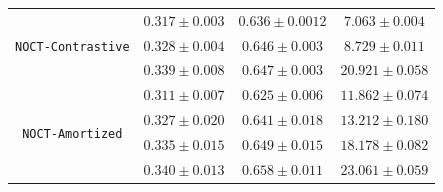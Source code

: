 \begin{table}[ht]
\begin{center}
\begin{sc}
{\begin{tabular}{c c c c}
        \multirow{3}{*}{\texttt{NOCT-Contrastive}} 
& $0.317\pm0.003$ & $0.636\pm0.0012$ & $7.063\pm0.004$ \\ 
& $0.328\pm0.004$ & $0.646\pm0.003$ & $8.729\pm0.011$ \\
& $0.339\pm0.008$ & $0.647\pm0.003$ & $20.921\pm0.058$ \\
\hline



        \multirow{4}{*}{\texttt{NOCT-Amortized}} 
& $0.311\pm0.007$ & $0.625\pm0.006$ & $11.862\pm0.074$ \\
& $0.327\pm0.020$ & $0.641\pm0.018$ & $13.212\pm0.180$ \\
& $0.335\pm0.015$ & $0.649\pm0.015$ & $18.178\pm0.082$ \\
& $0.340\pm0.013$ & $0.658\pm0.011$ & $23.061\pm0.059$ \\ \bottomrule

    \end{tabular}
    }
    \end{sc}

\end{center}
\vspace{-0.13in}
\end{table}


